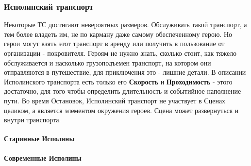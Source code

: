 \subsubsection{Исполинский транспорт}
Некоторые ТС достигают невероятных размеров. Обслуживать такой транспорт, а тем более владеть им, не по карману даже самому обеспеченному герою. Но герои могут взять этот транспорт в аренду или получить в пользование от организации - покровителя.
\newline Героям не нужно знать, сколько стоит, как тяжело обслуживается и насколько грузоподъемен транспорт, на котором они отправляются в путешествие, для приключения это - лишние детали. В описании Исполинского транспорта есть только его \textbf{Скорость} и \textbf{Проходимость} - этого достаточно, для того чтобы определить длительность и событийное наполнение пути. 
\newline Во время Остановок, Исполинский транспорт не участвует в Сценах целиком, а является элементом окружения героев. Сцена может развернуться и внутри транспорта.
\paragraph{Старинные Исполины}
\paragraph{Современные Исполины}
